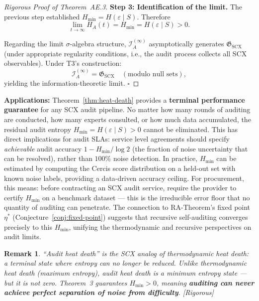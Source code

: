 \documentclass[12pt,a4paper]{article}
\newtheorem{remark}[theorem]{Remark}
\newcommand{\rigorous}{\textcolor{green!50!black}{\small\textsf{[Rigorous]}}}
\newcommand{\cI}{\mathcal{I}}
\newcommand{\sG}{\mathfrak{G}}
\begin{document}
\begin{proof}[Rigorous Proof of Theorem~AE.3]
\textbf{Step 3: Identification of the limit.}
The previous step established $H_{\min} = H(\varepsilon \mid S)$. Therefore
\[
\lim_{t\to\infty} H_A(t) = H_{\min} = H(\varepsilon \mid S) > 0.
\]

Regarding the limit $\sigma$-algebra structure, $\cI_A^{(\infty)}$ asymptotically generates $\sG_{\mathrm{SCX}}$ (under appropriate regularity conditions, i.e., the audit process collects all SCX observables). Under T3's construction:
\[
\cI_A^{(\infty)} = \sG_{\mathrm{SCX}} \quad (\text{modulo null sets}),
\]
yielding the information-theoretic limit. $\square$
\end{proof}

\medskip\noindent
\textbf{Applications:}
Theorem~\ref{thm:heat-death} provides a \textbf{terminal performance guarantee} for any SCX audit pipeline. No matter how many rounds of auditing are conducted, how many experts consulted, or how much data accumulated, the residual audit entropy $H_{\min}=H(\varepsilon\mid S)>0$ cannot be eliminated. This has direct implications for audit SLAs: service level agreements should specify \emph{achievable} audit accuracy $1-H_{\min}/\log 2$ (the fraction of noise uncertainty that can be resolved), rather than $100\%$ noise detection. In practice, $H_{\min}$ can be estimated by computing the Cercis score distribution on a held-out set with known noise labels, providing a data-driven accuracy ceiling. For procurement, this means: before contracting an SCX audit service, require the provider to certify $H_{\min}$ on a benchmark dataset --- this is the irreducible error floor that no quantity of auditing can penetrate. The connection to RA-Theorem's fixed point $\eta^*$ (Conjecture~\ref{conj:fixed-point}) suggests that recursive self-auditing converges precisely to this $H_{\min}$, unifying the thermodynamic and recursive perspectives on audit limits.

\begin{remark}
``Audit heat death'' is the SCX analog of thermodynamic heat death: a terminal state where entropy can no longer be reduced. Unlike thermodynamic heat death (maximum entropy), audit heat death is a \emph{minimum} entropy state --- but it is not zero. Theorem~3 guarantees $H_{\min}>0$, meaning \textbf{auditing can never achieve perfect separation of noise from difficulty}. \rigorous
\end{remark}
\end{document}
